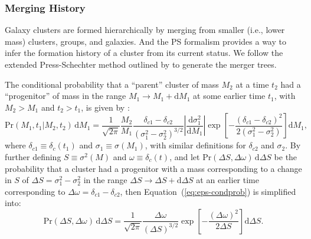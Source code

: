 \documentclass[modern]{aastex61}
\newcommand{\R}[1]{\mathrm{#1}}
\newcommand{\D}[1]{\R{d} #1}
\newcommand{\diff}[2]{\frac{\D{#1}}{\D{#2}}}
\begin{document}
\subsubsection{Merging History}
\label{sec:merging-history}

Galaxy clusters are formed hierarchically by merging from smaller (i.e.,
lower mass) clusters, groups, and galaxies.
And the PS formalism provides a way to infer the formation history
of a cluster from its current status.
We follow the extended Press-Schechter method outlined by \citet{lacey1993}
to generate the merger trees.

The conditional probability that a ``parent'' cluster of mass $M_2$ at
a time $t_2$ had a ``progenitor'' of mass in the range
$M_1 \to M_1 + \D{M_1}$ at some earlier time $t_1$,
with $M_2 > M_1$ and $t_2 > t_1$, is given by
\citep{lacey1993,randall2002}:
\begin{equation}
  \label{eq:eps-condprob}
  \R{Pr}(M_1, t_1 | M_2, t_2) \,\D{M_1} = \frac{1}{\sqrt{2\pi}} \frac{M_2}{M_1}
  \frac{\delta_{c1} - \delta_{c2}}{(\sigma_1^2 - \sigma_2^2)^{3/2}}
  \left| \diff{\sigma_1^2}{M_1} \right|
  \exp \!\left[ -\frac{(\delta_{c1} - \delta_{c2})^2}
    {2(\sigma_1^2 - \sigma_2^2)} \right] \D{M_1},
\end{equation}
where
$\delta_{c1} \equiv \delta_c(t_1)$ and $\sigma_1 \equiv \sigma(M_1)$,
with similar definitions for $\delta_{c2}$ and $\sigma_2$.
By further defining $S \equiv \sigma^2(M)$ and $\omega \equiv \delta_c(t)$,
and let $\R{Pr}(\Delta S, \Delta \omega) \,\D{\Delta S}$ be the probability
that a cluster had a progenitor with a mass corresponding to a change
in $S$ of $\Delta S = \sigma_1^2 - \sigma_2^2$ in the range
$\Delta S \to \Delta S + \D{\Delta S}$ at an earlier time
corresponding to $\Delta \omega = \delta_{c1} - \delta_{c2}$,
then Equation~(\ref{eq:eps-condprob}) is simplified into:
\begin{equation}
  \label{eq:eps-condprob-simp}
  \R{Pr}(\Delta S, \Delta \omega) \,\D{\Delta S} = \frac{1}{\sqrt{2\pi}}
  \frac{\Delta\omega}{(\Delta S)^{3/2}}
  \exp \!\left[ -\frac{(\Delta\omega)^2}{2 \Delta S} \right] \D{\Delta S}.
\end{equation}
\end{document}
